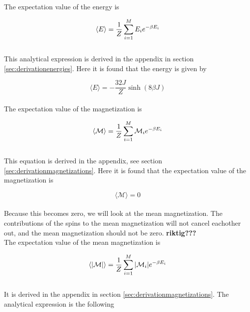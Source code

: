 \documentclass{article}
\begin{document}
The expectation value of the energy is

\begin{equation}    \label{eq:expectationenergy}
    \langle E \rangle = \frac{1}{Z} \sum _{i=1} ^M E_i e^{- \beta E_i} \\
\end{equation} \\

This analytical expression is derived in the appendix in section \ref{sec:derivationenergies}. Here it is found that the energy is given by

\begin{equation} \label{eq:finalenergy}
    \langle E \rangle = - \frac{32 J}{Z} \sinh(8 \beta J)
\end{equation} \\

The expectation value of the magnetization is

\begin{equation}    \label{eq:magnetization}
    \langle \mathcal{M} \rangle = \frac{1}{Z} \sum _{i=1} ^M \mathcal{M}_i e^{- \beta E_i} \\
\end{equation} \\

This equation is derived in the appendix, see section \ref{sec:derivationmagnetizations}. Here it is found that the expectation value of the magnetization is

\begin{equation} \label{eq:finalmagnetization}
    \langle \mathcal{M} \rangle = 0
\end{equation} \\

Because this becomes zero, we will look at the mean magnetization. The contributions of the spins to the mean magnetization will not cancel eachother out, and the mean magnetization should not be zero. \textbf{riktig???} \\

The expectation value of the mean magnetization is

\begin{equation}    \label{eq:meanmagnetization}
    \langle |\mathcal{M}| \rangle = \frac{1}{Z} \sum _{i=1} ^M |\mathcal{M}_i| e^{- \beta E_i} \\
\end{equation} \\

It is derived in the appendix in section \ref{sec:derivationmagnetizations}. The analytical expression is the following
\end{document}
